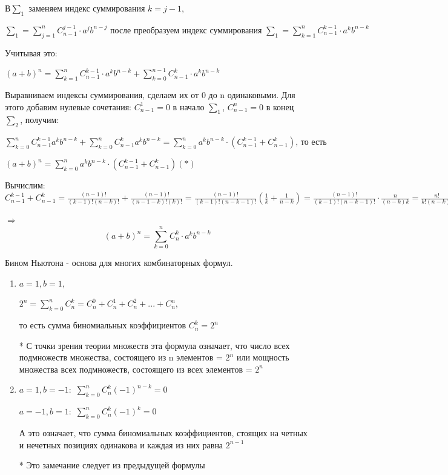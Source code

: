 \documentclass[12pt, a4paper]{article}
\begin{document}
$\textrm{В} \sum_1 \text{ заменяем индекс суммирования } {k={j-1}},$ 

$\sum_1=\sum\limits_{j=1}^{n}  C_{n-1}^{j-1} \cdot a^{j} b^{n-j} \text{ после преобразуем индекс суммирования }  \sum_1 = \sum\limits_{k=1}^{n}  C_{n-1}^{k-1} \cdot a^k b^{n-k}$

\textrm{Учитывая это:}

$(a+b)^n = \sum\limits_{k=1}^{n}  C_{n-1}^{k-1} \cdot a^{k} b^{n-k} + \sum\limits_{k=0}^{n-1}  C_{n-1}^{k} \cdot a^{k} b^{n-k}$

Выравниваем индексы суммирования, сделаем их от 0 до n одинаковыми. Для этого добавим нулевые сочетания:
$C_{n-1}^1=0$ в начало $\sum_1$, $C_{n-1}^n = 0$ в конец $\sum_2$, получим:

$\sum\limits_{k=0}^{n} C_{n-1}^{k-1} a^k b^{n-k} +  \sum\limits_{k=0}^{n} C_{n-1}^{k} a^k b^{n-k}  = \sum\limits_{k=0}^n  a^k b^{n-k} \cdot (C_{n-1}^{k-1} + C_{n-1}^{k}) \text{, то есть}$ 

$(a+b)^n =  \sum\limits_{k=0}^n  a^k b^{n-k} \cdot (C_{n-1}^{k-1} + C_{n-1}^{k} ) (*)$



\textrm{Вычислим:}
$C_{n-1}^{k-1} + C_{n-1}^{k}= \frac{(n-1)!}{(k-1)!(n-k)!} + \frac{(n-1)!}{(n-1-k)!(k)!}= \frac{(n-1)!}{(k-1)!(n-k-1)!}(\frac{1}{k}+ \frac{1}{n-k}) = \frac{(n-1)!}{(k-1)!(n-k-1)!} \cdot \frac{n}{(n-k)k} = \frac{n!}{k!(n-k)!} = C^{k}_n \textrm{ (подставим это в равенство *)}
$

{$\Longrightarrow$}
\[(a+b)^n =\sum\limits_{k=0}^n  C_{n}^{k} \cdot a^k b^{n-k}
\]




Бином Ньютона - основа для многих комбинаторных формул.

\begin{enumerate}

    \item $a = 1, b = 1,$
    
    $2^n=\sum\limits_{k=0}^n C_{n}^{k} = C_{n}^{0} +C_{n}^{1} + C_{n}^{2} + ... + C_{n}^{n}$,
    
    то есть сумма биномиальных коэффициентов $C_{n}^{k} = 2^n$
    
    * С точки зрения теории множеств эта формула означает, что число всех подмножеств множества, состоящего из n элементов = $2^n$ или мощность множества всех подмножеств, состоящего из всех элементов = $2^n$
    
    
    \item  $a = 1, b = -1:$ $\sum\limits_{k=0}^n C_{n}^{k} (-1)^{n-k} = 0$
    
    $a = -1, b = 1:$
    $\sum\limits_{k=0}^n C_{n}^{k} (-1)^{k} = 0$
    
    А это означает, что сумма биномиальных коэффициентов, стоящих на четных и нечетных позициях одинакова и каждая из них равна $2^{n-1}$
    
    * Это замечание следует из предыдущей  формулы
    
\end{enumerate}
\end{document}
